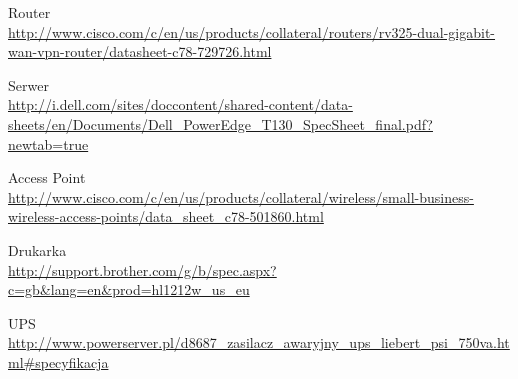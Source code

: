 \documentclass[a4paper, 12pt]{article}
\begin{document}
Router
\\\url{http://www.cisco.com/c/en/us/products/collateral/routers/rv325-dual-gigabit-wan-vpn-router/datasheet-c78-729726.html}

Serwer
\\\url{http://i.dell.com/sites/doccontent/shared-content/data-sheets/en/Documents/Dell_PowerEdge_T130_SpecSheet_final.pdf?newtab=true}

Access Point
\\\url{http://www.cisco.com/c/en/us/products/collateral/wireless/small-business-wireless-access-points/data_sheet_c78-501860.html}

Drukarka
\\\url{http://support.brother.com/g/b/spec.aspx?c=gb&lang=en&prod=hl1212w_us_eu}

UPS
\\\url{http://www.powerserver.pl/d8687_zasilacz_awaryjny_ups_liebert_psi_750va.html#specyfikacja}
\end{document}
